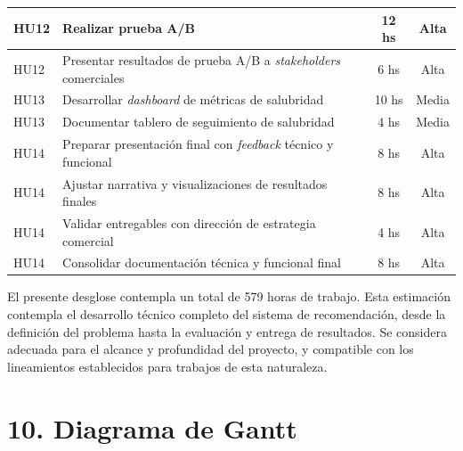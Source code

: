\documentclass[
11pt, %
]{charter}
\begin{document}
\begin{longtable}{|p{2cm}|p{10cm}|c|c|}
HU12 & Realizar prueba A/B & 12 hs & Alta \\ \hline
HU12 & Presentar resultados de prueba A/B a \textit{stakeholders} comerciales & 6 hs & Alta \\ \hline

HU13 & Desarrollar \textit{dashboard} de métricas de salubridad & 10 hs & Media \\ \hline
HU13 & Documentar tablero de seguimiento de salubridad & 4 hs & Media \\ \hline

HU14 & Preparar presentación final con \textit{feedback} técnico y funcional & 8 hs & Alta \\ \hline
HU14 & Ajustar narrativa y visualizaciones de resultados finales & 8 hs & Alta \\ \hline
HU14 & Validar entregables con dirección de estrategia comercial & 4 hs & Alta \\ \hline
HU14 & Consolidar documentación técnica y funcional final & 8 hs & Alta \\ \hline

\end{longtable}

El presente desglose contempla un total de 579 horas de trabajo. Esta estimación contempla el desarrollo técnico completo del sistema de recomendación, desde la definición del problema hasta la evaluación y entrega de resultados. Se considera adecuada para el alcance y profundidad del proyecto, y compatible con los lineamientos establecidos para trabajos de esta naturaleza.

\section{10. Diagrama de Gantt}
\label{sec:gantt}


\end{document}
